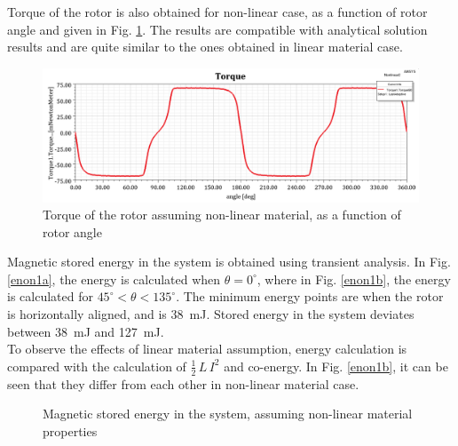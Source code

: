 \documentclass{reportClass}
\begin{document}
Torque of the rotor is also obtained for non-linear case, as a function of rotor angle and given in Fig. \ref{fig:torque_angle_nl}. The results are compatible with analytical solution results and are quite similar to the ones obtained in linear material case.\\

\begin{figure}[h!]
\centering
\includegraphics[width=0.75\linewidth]{torque_nonlin_wrtangle.png}
\caption{Torque of the rotor assuming non-linear material, as a function of rotor angle}
\label{fig:torque_angle_nl}
\end{figure}


Magnetic stored energy in the system is obtained using transient analysis. In Fig. \ref{enon1a}, the energy is calculated when $\theta = 0^\circ$, where in Fig. \ref{enon1b}, the energy is calculated for $45^\circ < \theta < 135^\circ$. The minimum energy points are when the rotor is horizontally aligned, and is 38~mJ. Stored energy in the system deviates between 38~mJ and 127~mJ.\\

To observe the effects of linear material assumption, energy calculation is compared with the calculation of $\frac{1}{2}\,L\,I^2$ and co-energy. In Fig. \ref{enon1b}, it can be seen that they differ from each other in non-linear material case.\\

\begin{figure}[h!]
    \centering
       \hspace{0.5cm}

  \caption{Magnetic stored energy in the system, assuming non-linear material properties}
  \label{fig:energy_nonlin} 
\end{figure}
\end{document}
